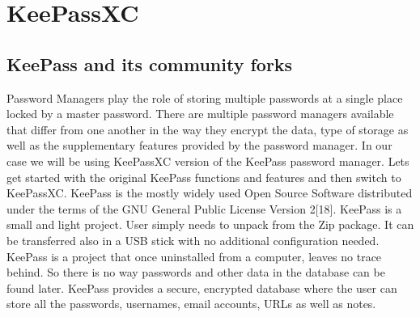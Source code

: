 \documentclass[12pt]{article}
\begin{document}
\section{KeePassXC}

\subsection{KeePass and its community forks}

Password Managers play the role of storing multiple passwords at a single place locked by a master password. There are multiple password managers available that differ from one another in the way they encrypt the data, type of storage as well as the supplementary features provided by the password manager. In our case we will be using KeePassXC version of the KeePass password manager. Lets get  started with the original KeePass functions and features and then switch to KeePassXC.  KeePass is the mostly widely  used Open Source Software distributed under the terms of the GNU General Public License Version 2[18]. KeePass is a small and light project. User simply needs to unpack from the Zip package. It can be transferred also in a USB stick with no additional configuration needed. KeePass is a project that once uninstalled from a computer, leaves no trace behind. So there is no way passwords and other data in the database can be found later. KeePass provides a secure, encrypted database where the user can store all the passwords, usernames, email accounts, URLs as well as notes. 

\bigskip
\end{document}
